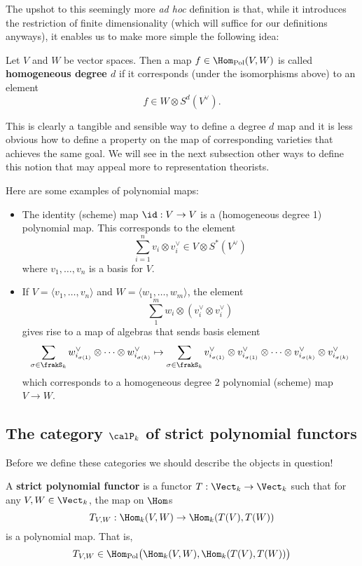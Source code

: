 \documentclass[12pt]{article}
\begin{document}
The upshot to this seemingly more \textit{ad hoc} definition is that, while it introduces the restriction of finite dimensionality (which will suffice for our 
definitions anyways), it enables us to make more simple the following idea:
\begin{defn}\label{def:homog-poly-map}
	Let $V$ and $W$ be vector spaces. Then a map $f\in \Hom_\text{Pol}(V,W)$ is called \textbf{homogeneous degree $d$} if 
	it corresponds (under the isomorphisms above) to an element 
	\[f\in W\otimes S^d(V^\vee).\]
\end{defn}
This is clearly a tangible and sensible way to define a degree $d$ map and it is less obvious how to define a property 
on the map of corresponding varieties that achieves the same goal. We will see in the next subsection other ways to define this 
notion that may appeal more to representation theorists.
\begin{ex}
	Here are some examples of polynomial maps:
	\begin{itemize}
		\item The identity (scheme) map $\id:V\to V$ is a (homogeneous degree 1) polynomial map. This corresponds to the element 
		\[\sum_{i=1}^n v_i\otimes v_i^\vee\in V\otimes S^\ast(V^\vee)\]
		where $v_1,\dots,v_n$ is a basis for $V$.
		\item If $V=\langle v_1,\dots,v_n\rangle$ and $W=\langle w_1,\dots,w_m\rangle$, the element
		\[\sum_1^m w_i\otimes (v_i^\vee\otimes v_i^\vee)\]
		gives rise to a map of algebras that sends basis element
		\[\sum_{\sigma\in\frakS_k}w_{i_{\sigma(1)}}^\vee\otimes \cdots\otimes w_{i_{\sigma(k)}}^\vee\mapsto \sum_{\sigma\in\frakS_k}v_{i_{\sigma(1)}}^\vee\otimes v_{i_{\sigma(1)}}^\vee\otimes \cdots\otimes v_{i_{\sigma(k)}}^\vee\otimes v_{i_{\sigma(k)}}^\vee\]
		which corresponds to a homogeneous degree 2 polynomial (scheme) map $V\to W$.
	\end{itemize}
\end{ex}

\subsection{The category \texorpdfstring{$\calP_k$}{Pk} of strict polynomial functors}
Before we define these categories we should describe the objects in question!
\begin{defn}
	A \textbf{strict polynomial functor} is a functor $T:\Vect_k\to \Vect_k$ such that for any $V,W\in\Vect_k$,
	the map on $\Hom$s
	\[T_{V,W}:\Hom_k(V,W)\to \Hom_k(T(V),T(W))\]
	is a polynomial map. That is,
	\[T_{V,W}\in\Hom_\text{Pol}\big(\Hom_k(V,W), \Hom_k(T(V),T(W))\big)\]
\end{defn}
\end{document}
